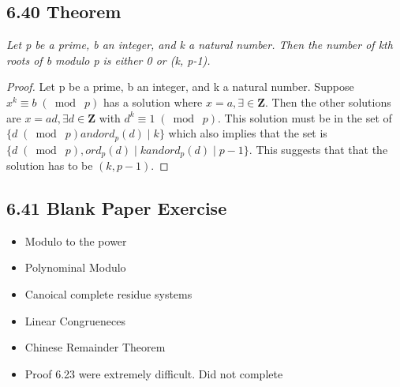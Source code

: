 \documentclass{article}
\begin{document}
\subsection*{6.40 Theorem} 
\quad \textit{Let p be a prime, b an integer, and k a natural number. Then the number of kth roots of b modulo p is either 0 or (k, p-1).}

\begin{proof}
Let p be a prime, b an integer, and k a natural number. Suppose $x^k \equiv b \;(\bmod\; p)$ has a solution where $x = a, \exists \in \mathbf{Z}$. Then the other solutions are $x = ad, \exists d \in \mathbf{Z}$ with $d^k \equiv 1 \;(\bmod\; p)$. This solution must be in the set of $\{d \;(\bmod\; p) and ord_p(d) \mid k\}$ which also implies that the set is $\{d \;(\bmod\; p), ord_p(d) \mid k and ord_p(d) \mid p-1\}$. This suggests that that the solution has to be $(k, p-1)$.
\end{proof}

\subsection*{6.41 Blank Paper Exercise} 
\begin{itemize}
    \item Modulo to the power
    \item Polynominal Modulo
    \item Canoical complete residue systems
    \item Linear Congrueneces
    \item Chinese Remainder Theorem
    \item Proof 6.23 were extremely difficult. Did not complete 
\end{itemize}
\end{document}
